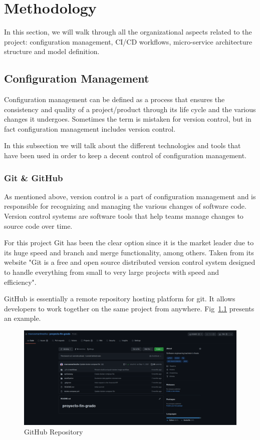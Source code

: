 \chapter{Methodology}
\label{mt:methodology}

In this section, we will walk through all the organizational aspects related to the project: configuration management, CI/CD workflows, micro-service architecture structure and model definition.

\section{Configuration Management}

Configuration management can be defined as a process that ensures the consistency and quality of a project/product through its life cycle and the various changes it undergoes. Sometimes the term is mistaken for version control, but in fact configuration management includes version control.

In this subsection we will talk about the different technologies and tools that have been used in order to keep a decent control of configuration management.

\subsection{Git \& GitHub}

As mentioned above, version control is a part of configuration management and is responsible for recognizing and managing the various changes of software code. Version control systems are software tools that help teams manage changes to source code over time. 

For this project Git has been the clear option since it is the market leader due to its huge speed and branch and merge functionality, among others. Taken from its website "Git is a free and open source distributed version control system designed to handle everything from small to very large projects with speed and efficiency".~\cite{gitDefinition}

GitHub is essentially a remote repository hosting platform for git. It allows developers to work together on the same project from anywhere. Fig~\ref{fig:current-status-github} presents an example.

\begin{figure}[H]
    \centering
    \includegraphics[width=\textwidth]{figures/github.png}
    \caption{GitHub Repository}
    \label{fig:current-status-github}
\end{figure}

